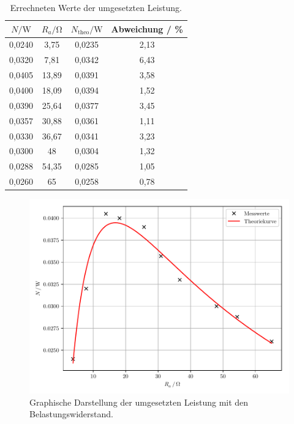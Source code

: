 \begin{table}[H]
  \centering
  \caption{Errechneten Werte der umgesetzten Leistung.}
  \label{tab:5}
  \begin{tabular}{c c c c}
    \toprule
    $N /\si{\watt}$ & $R_a / \si{\ohm}$ & $N_{\text{theo}} / \si{\watt}$ & Abweichung / \% \\
    \midrule
    0,0240 & 3,75  & 0,0235 & 2,13 \\
    0,0320 & 7,81  & 0,0342 & 6,43 \\
    0,0405 & 13,89 & 0,0391 & 3,58 \\
    0,0400 & 18,09 & 0,0394 & 1,52 \\
    0,0390 & 25,64 & 0,0377 & 3,45 \\
    0,0357 & 30,88 & 0,0361 & 1,11 \\
    0,0330 & 36,67 & 0,0341 & 3,23 \\
    0,0300 & 48    & 0,0304 & 1,32 \\
    0,0288 & 54,35 & 0,0285 & 1,05 \\
    0,0260 & 65    & 0,0258 & 0,78 \\
    \bottomrule
  \end{tabular}
\end{table}

\begin{figure}[H]
  \centering
  \includegraphics{plot5.pdf}
  \caption{Graphische Darstellung der umgesetzten Leistung mit den Belastungswiderstand.}
  \label{abb:8}
\end{figure}
